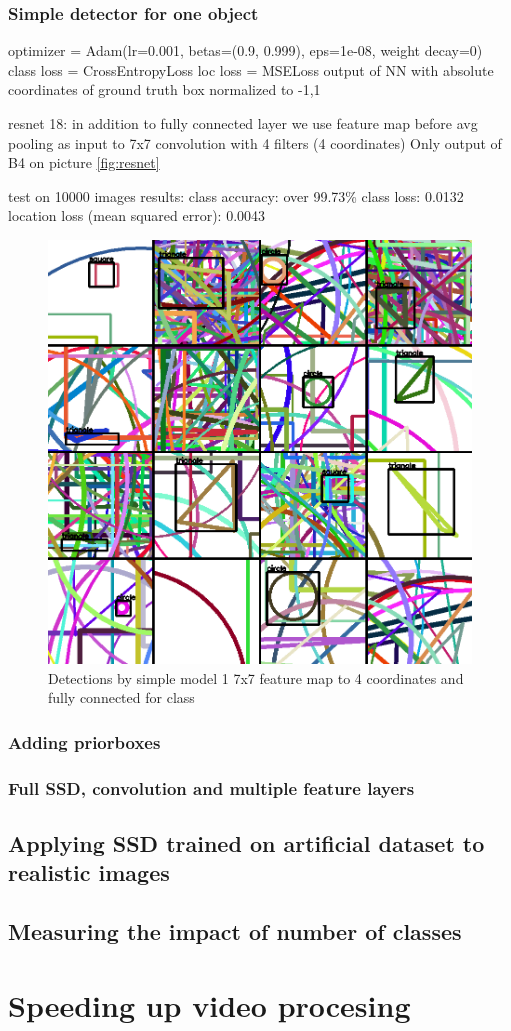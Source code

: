 \subsubsection{Simple detector for one object}

optimizer = Adam(lr=0.001, betas=(0.9, 0.999), eps=1e-08, weight decay=0)
class loss = CrossEntropyLoss
loc loss = MSELoss output of NN with absolute coordinates of ground truth box normalized to -1,1 

resnet 18: in addition to fully connected layer we use feature map before avg pooling as input to 7x7 convolution with 4 filters (4 coordinates) Only output of B4 on picture \cref{fig:resnet} 

test on 10000 images
results: class accuracy: over 99.73\%
class loss: 0.0132
location loss (mean squared error): 0.0043


\begin{figure}
    \centering
    \includegraphics[width=\textwidth]{img/simple_detection.png}
    \caption{Detections by simple model 1 7x7 feature map to 4 coordinates and fully connected for class}
    \label{fig:my_label}
\end{figure}

\subsubsection{Adding priorboxes}

\subsubsection{Full SSD, convolution and multiple feature layers}


\subsection{Applying SSD trained on artificial dataset to realistic images}

\subsection{Measuring the impact of number of classes}

\section{Speeding up video procesing}